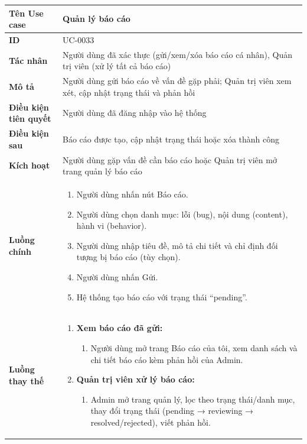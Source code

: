 {
\renewcommand{\arraystretch}{1.5}

\begin{tabularx}{\textwidth}{|>{\raggedright\arraybackslash}X|>{\raggedright\arraybackslash}X|}
\hline
\textbf{Tên Use case} & Quản lý báo cáo \\
\hline
\textbf{ID} & UC-0033 \\
\hline
\textbf{Tác nhân} & Người dùng đã xác thực (gửi/xem/xóa báo cáo cá nhân), Quản trị viên (xử lý tất cả báo cáo) \\
\hline
\textbf{Mô tả} & Người dùng gửi báo cáo về vấn đề gặp phải; Quản trị viên xem xét, cập nhật trạng thái và phản hồi \\
\hline
\textbf{Điều kiện tiên quyết} & Người dùng đã đăng nhập vào hệ thống \\
\hline
\textbf{Điều kiện sau} & Báo cáo được tạo, cập nhật trạng thái hoặc xóa thành công \\
\hline
\textbf{Kích hoạt} & Người dùng gặp vấn đề cần báo cáo hoặc Quản trị viên mở trang quản lý báo cáo \\
\hline
\textbf{Luồng chính} &
\begin{enumerate}
    \item Người dùng nhấn nút Báo cáo.
    \item Người dùng chọn danh mục: lỗi (bug), nội dung (content), hành vi (behavior).
    \item Người dùng nhập tiêu đề, mô tả chi tiết và chỉ định đối tượng bị báo cáo (tùy chọn).
    \item Người dùng nhấn Gửi.
    \item Hệ thống tạo báo cáo với trạng thái ``pending''.
\end{enumerate} \\
\hline
\textbf{Luồng thay thế} &
\begin{enumerate}
    \item \textbf{Xem báo cáo đã gửi:}
    \begin{enumerate}
        \item[1A.] Người dùng mở trang Báo cáo của tôi, xem danh sách và chi tiết báo cáo kèm phản hồi của Admin.
    \end{enumerate}
    \item \textbf{Quản trị viên xử lý báo cáo:}
    \begin{enumerate}
        \item[1B.] Admin mở trang quản lý, lọc theo trạng thái/danh mục, thay đổi trạng thái (pending → reviewing → resolved/rejected), viết phản hồi.

\end{enumerate}
\end{enumerate}
\end{tabularx}}
